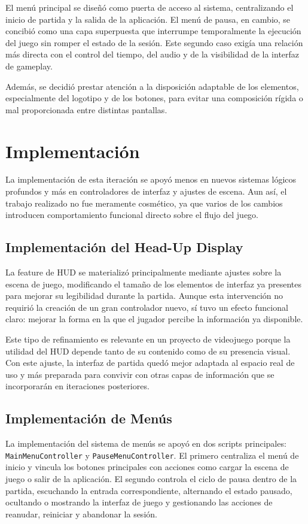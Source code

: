El menú principal se diseñó como puerta de acceso al sistema, centralizando el inicio de
partida y la salida de la aplicación. El menú de pausa, en cambio, se concibió como una
capa superpuesta que interrumpe temporalmente la ejecución del juego sin romper el estado de
la sesión. Este segundo caso exigía una relación más directa con el control del tiempo, del
audio y de la visibilidad de la interfaz de gameplay.

Además, se decidió prestar atención a la disposición adaptable de los elementos, especialmente
del logotipo y de los botones, para evitar una composición rígida o mal proporcionada entre
distintas pantallas.

\section{Implementación}
La implementación de esta iteración se apoyó menos en nuevos sistemas lógicos profundos y
más en controladores de interfaz y ajustes de escena. Aun así, el trabajo realizado no fue
meramente cosmético, ya que varios de los cambios introducen comportamiento funcional
directo sobre el flujo del juego.

\subsection{Implementación del Head-Up Display}
La feature de HUD se materializó principalmente mediante ajustes sobre la escena de juego,
modificando el tamaño de los elementos de interfaz ya presentes para mejorar su legibilidad
durante la partida. Aunque esta intervención no requirió la creación de un gran controlador
nuevo, sí tuvo un efecto funcional claro: mejorar la forma en la que el jugador percibe la
información ya disponible.

Este tipo de refinamiento es relevante en un proyecto de videojuego porque la utilidad del
HUD depende tanto de su contenido como de su presencia visual. Con este ajuste, la interfaz
de partida quedó mejor adaptada al espacio real de uso y más preparada para convivir con
otras capas de información que se incorporarán en iteraciones posteriores.

\subsection{Implementación de Menús}
La implementación del sistema de menús se apoyó en dos scripts principales:
\texttt{MainMenuController} y \texttt{PauseMenuController}. El primero centraliza el menú de
inicio y vincula los botones principales con acciones como cargar la escena de juego o salir
de la aplicación. El segundo controla el ciclo de pausa dentro de la partida, escuchando la
entrada correspondiente, alternando el estado pausado, ocultando o mostrando la interfaz de
juego y gestionando las acciones de reanudar, reiniciar y abandonar la sesión.

